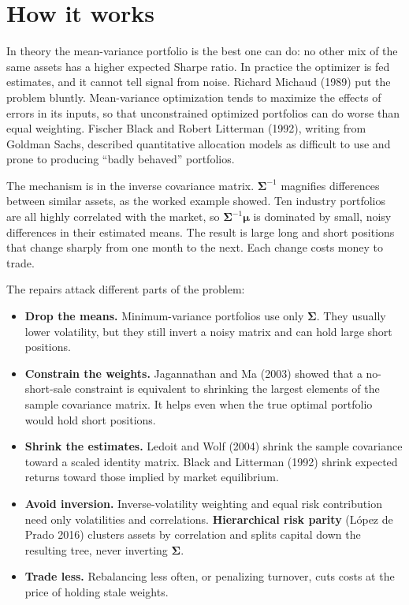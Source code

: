 \section{How it works}
\label{sec:19-how}

In theory the mean-variance portfolio is the best one can do: no other mix of the same assets has a higher expected Sharpe ratio. In practice the optimizer is fed estimates, and it cannot tell signal from noise. Richard Michaud (1989) put the problem bluntly. Mean-variance optimization tends to maximize the effects of errors in its inputs, so that unconstrained optimized portfolios can do worse than equal weighting. Fischer Black and Robert Litterman (1992), writing from Goldman Sachs, described quantitative allocation models as difficult to use and prone to producing ``badly behaved'' portfolios.

The mechanism is in the inverse covariance matrix. $\boldsymbol{\Sigma}^{-1}$ magnifies differences between similar assets, as the worked example showed. Ten industry portfolios are all highly correlated with the market, so $\boldsymbol{\Sigma}^{-1}\boldsymbol{\mu}$ is dominated by small, noisy differences in their estimated means. The result is large long and short positions that change sharply from one month to the next. Each change costs money to trade.

The repairs attack different parts of the problem:

\begin{itemize}
  \item \textbf{Drop the means.} Minimum-variance portfolios use only $\boldsymbol{\Sigma}$. They usually lower volatility, but they still invert a noisy matrix and can hold large short positions.
  \item \textbf{Constrain the weights.} Jagannathan and Ma (2003) showed that a no-short-sale constraint is equivalent to shrinking the largest elements of the sample covariance matrix. It helps even when the true optimal portfolio would hold short positions.
  \item \textbf{Shrink the estimates.} Ledoit and Wolf (2004) shrink the sample covariance toward a scaled identity matrix. Black and Litterman (1992) shrink expected returns toward those implied by market equilibrium.
  \item \textbf{Avoid inversion.} Inverse-volatility weighting and equal risk contribution need only volatilities and correlations. \textbf{Hierarchical risk parity} (L\'opez de Prado 2016) clusters assets by correlation and splits capital down the resulting tree, never inverting $\boldsymbol{\Sigma}$.
  \item \textbf{Trade less.} Rebalancing less often, or penalizing turnover, cuts costs at the price of holding stale weights.
\end{itemize}

